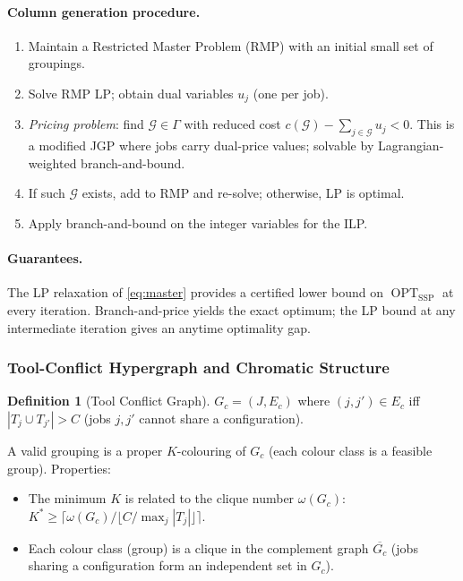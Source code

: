 \documentclass[11pt,a4paper]{article}
\theoremstyle{plain}
\theoremstyle{definition}
\newtheorem{definition}[theorem]{Definition}
\DeclareMathOperator{\OPT}{OPT}
\newcommand{\calG}{\mathcal{G}}     %
\newcommand{\Kstar}{K^{*}}          %
\begin{document}
\paragraph{Column generation procedure.}
\begin{enumerate}[label=\arabic*.]
  \item Maintain a Restricted Master Problem (RMP) with an initial small set of groupings.
  \item Solve RMP LP; obtain dual variables $u_j$ (one per job).
  \item \emph{Pricing problem}: find $\calG \in \Gamma$ with reduced cost
        $c(\calG) - \sum_{j \in \calG} u_j < 0$.
        This is a modified JGP where jobs carry dual-price values; solvable by
        Lagrangian-weighted branch-and-bound.
  \item If such $\calG$ exists, add to RMP and re-solve; otherwise, LP is optimal.
  \item Apply branch-and-bound on the integer variables for the ILP.
\end{enumerate}

\paragraph{Guarantees.}
The LP relaxation of \eqref{eq:master} provides a certified lower bound on $\OPT_{\text{SSP}}$
at every iteration. Branch-and-price yields the exact optimum; the LP bound at any
intermediate iteration gives an anytime optimality gap.

\subsubsection{Tool-Conflict Hypergraph and Chromatic Structure}
\label{sec:conflict}

\begin{definition}[Tool Conflict Graph]
$G_c = (J, E_c)$ where $(j,j') \in E_c$ iff $|T_j \cup T_{j'}| > C$ (jobs $j,j'$
cannot share a configuration).
\end{definition}

A valid grouping is a proper $K$-colouring of $G_c$ (each colour class is a feasible
group). Properties:
\begin{itemize}
  \item The minimum $K$ is related to the clique number $\omega(G_c)$:
        $\Kstar \ge \lceil \omega(G_c) / \lfloor C / \max_j |T_j| \rfloor \rceil$.
  \item Each colour class (group) is a clique in the complement graph $\overline{G_c}$
        (jobs sharing a configuration form an independent set in $G_c$).
\end{itemize}
\end{document}
